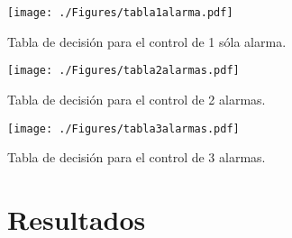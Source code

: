 \begin{table}[ht!]
	\centering
    \texttt{[image: ./Figures/tabla1alarma.pdf]}
	\caption{Tabla de decisión para el control de 1 sóla alarma.}
	\label{tab:1alarma}
\end{table}

\begin{table}[ht!]
	\centering
    \texttt{[image: ./Figures/tabla2alarmas.pdf]}
	\caption{Tabla de decisión para el control de 2 alarmas.}
	\label{tab:2alarmas}
\end{table}

\begin{table}[ht!]
	\centering
    \texttt{[image: ./Figures/tabla3alarmas.pdf]}
	\caption{Tabla de decisión para el control de 3 alarmas.}
	\label{tab:3alarmas}
\end{table}


\section{Resultados}

